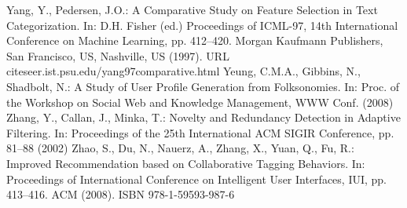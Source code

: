 \begin{thebibliography}{110}
Yang, Y., Pedersen, J.O.: A Comparative Study on Feature Selection in Text Categorization. In: D.H. Fisher (ed.) Proceedings of ICML-97, 14th International Conference on Machine Learning, pp. 412–420. Morgan Kaufmann Publishers, San Francisco, US, Nashville, US (1997). URL citeseer.ist.psu.edu/yang97comparative.html
Yeung, C.M.A., Gibbins, N., Shadbolt, N.: A Study of User Profile Generation from Folksonomies. In: Proc. of the Workshop on Social Web and Knowledge Management, WWW Conf. (2008)
Zhang, Y., Callan, J., Minka, T.: Novelty and Redundancy Detection in Adaptive Filtering. In: Proceedings of the 25th International ACM SIGIR Conference, pp. 81–88 (2002)
Zhao, S., Du, N., Nauerz, A., Zhang, X., Yuan, Q., Fu, R.: Improved Recommendation based on Collaborative Tagging Behaviors. In: Proceedings of International Conference on Intelligent User Interfaces, IUI, pp. 413–416. ACM (2008). ISBN 978-1-59593-987-6
\end{thebibliography}